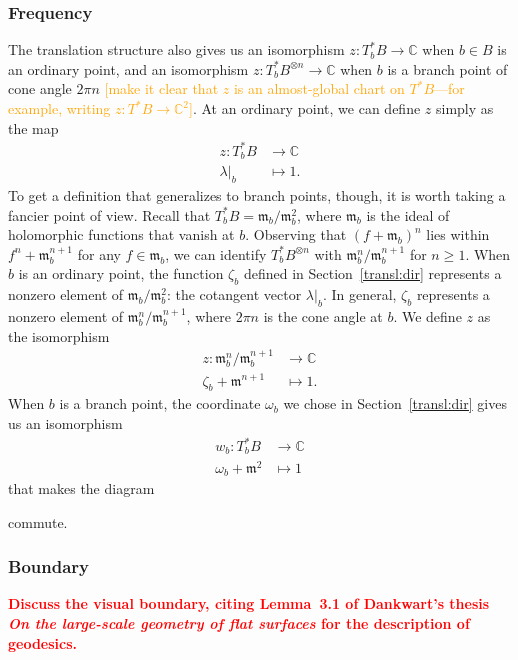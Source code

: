 \documentclass{article}
\newcommand{\maps}{\colon}
\newcommand{\C}{\mathbb{C}}
\newcommand{\blankbox}{{\fboxsep 0pt \colorbox{lightgray}{\phantom{$h$}}}}
\newcommand{\van}{\mathfrak{m}}
\theoremstyle{definition}
\theoremstyle{plain}
\begin{document}
\subsubsection{Frequency}\label{transl-freq}
%
The translation structure also gives us an isomorphism $z \maps T^*_bB \to \C$ when $b \in B$ is an ordinary point, and an isomorphism $z \maps T^*_bB^{\otimes n} \to \C$ when $b$ is a branch point of cone angle $2\pi n$ \textcolor{orange}{[make it clear that $z$ is an almost-global chart on $T^*B$---for example, writing $z\colon T^*B\to\C^2$]}. At an ordinary point, we can define $z$ simply as the map
\begin{align*}
z \maps T^*_bB & \to \C \\
\lambda\big|_b & \mapsto 1.
\end{align*}
To get a definition that generalizes to branch points, though, it is worth taking a fancier point of view. Recall that $T^*_bB = \van_b / \van_b^2$, where $\van_b$ is the ideal of holomorphic functions that vanish at $b$. Observing that $(f + \van_b)^n$ lies within $f^n + \van_b^{n+1}$ for any $f \in \van_b$, we can identify $T^*_bB^{\otimes n}$ with $\van_b^n / \van_b^{n+1}$ for $n \ge 1$. When $b$ is an ordinary point, the function $\zeta_b$ defined in Section~\ref{transl:dir} represents a nonzero element of $\van_b / \van_b^2$: the cotangent vector $\lambda\big|_b$. In general, $\zeta_b$ represents a nonzero element of $\van_b^n / \van_b^{n+1}$, where $2\pi n$ is the cone angle at $b$. We define $z$ as the isomorphism
\begin{align*}
z \maps \van_b^n / \van_b^{n+1} & \to \C \\
\zeta_b + \van^{n+1} & \mapsto 1.
\end{align*}
When $b$ is a branch point, the coordinate $\omega_b$ we chose in Section~\ref{transl:dir} gives us an isomorphism
\begin{align*}
w_b \maps T^*_bB & \to \C \\
\omega_b + \van^2 & \mapsto 1
\end{align*}
that makes the diagram
\begin{center}
\end{center}
commute.
\subsubsection{Boundary}
\textcolor{red}{\textbf{Discuss the visual boundary, citing Lemma~3.1 of Dankwart's thesis \textit{On the large-scale geometry of flat surfaces} for the description of geodesics.}}
%
\end{document}
